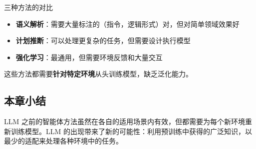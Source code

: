\begin{knowledgebox}{三种方法的对比}
\begin{itemize}
    \item \textbf{语义解析}：需要大量标注的（指令，逻辑形式）对，但对简单领域效果好
    \item \textbf{计划推断}：可以处理更复杂的任务，但需要设计执行模型
    \item \textbf{强化学习}：最通用，但需要环境反馈和大量交互
\end{itemize}
这些方法都需要\textbf{针对特定环境}从头训练模型，缺乏泛化能力。
\end{knowledgebox}

\subsection{本章小结}

LLM 之前的智能体方法虽然在各自的适用场景内有效，但都需要为每个新环境重新训练模型。LLM 的出现带来了新的可能性：利用预训练中获得的广泛知识，以最少的适配来处理各种环境中的任务。


